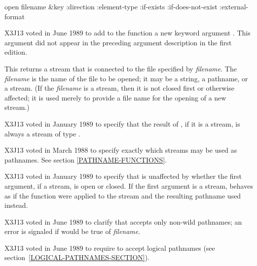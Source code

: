 \begin{defun}[Function]
open filename &key :direction :element-type :if-exists :if-does-not-exist :external-format

\begin{newer}
X3J13 voted in June 1989 
to add to the function  a new keyword argument .
This argument did not appear in the preceding argument description in the
first edition.
\end{newer}

This returns a stream that is connected to the file specified by {\it filename}.
The {\it filename} is the name of the file to be opened; it may be a string,
a pathname, or a stream.  (If the {\it filename} is a stream, then it is not
closed first or otherwise affected; it is used merely to provide a file name
for the opening of a new stream.)

\begin{new}
X3J13 voted in January 1989
to specify that the result of
, if it is a stream, is always a stream of type .
\end{new}

\begin{new}
X3J13 voted in March 1988
to specify exactly which streams may be used as pathnames.
See section \ref{PATHNAME-FUNCTIONS}.
\end{new}

\begin{new}
X3J13 voted in January 1989
to specify that  is unaffected by
whether the first argument, if a stream, is open or closed. If the first
argument is a stream,  behaves as if the function 
were applied to the stream and the resulting pathname used instead.
\end{new}

\begin{newer}
X3J13 voted in June 1989 
to clarify that  accepts only non-wild pathnames;
an error is signaled if  would be true of {\it filename}.
\end{newer}

\begin{newer}
X3J13 voted in June 1989  to require 
to accept logical pathnames (see section~\ref{LOGICAL-PATHNAMES-SECTION}).
\end{newer}


\end{defun}
